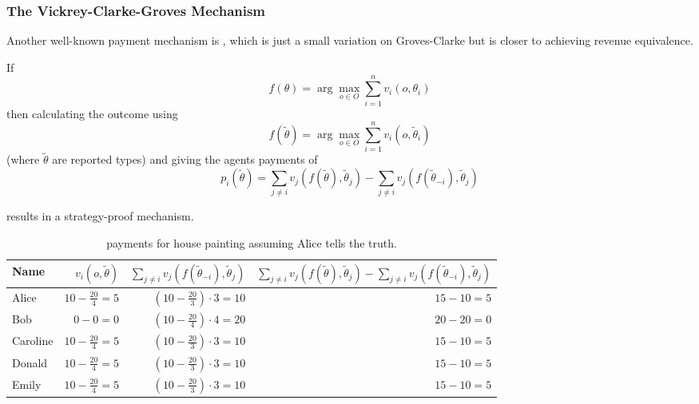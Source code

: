 \subsubsection{The Vickrey-Clarke-Groves Mechanism}

Another well-known payment mechanism is ,
which is just a small variation on Groves-Clarke but is closer to
achieving revenue equivalence.

\begin{theorem}
  \label{vcg}
  If
  \[
  f(\theta) = \arg \max_{o \in O} \sum_{i=1}^n v_i(o,\theta_i)
  \]
  then calculating the outcome using 
  \[
  f(\tilde{\theta}) = \arg \max_{o \in O} \sum_{i=1}^n v_i(o, \tilde{\theta}_i)
  \]
  (where $\tilde{\theta}$ are reported types) and giving the agents
  payments of 
  \begin{equation}
    \label{eq:vcg-payments}
  p_i(\tilde{\theta}) = \sum_{j \neq i} v_j(f(\tilde{\theta}),
  \tilde{\theta}_j)
  - \sum_{j \neq i} v_j(f(\tilde{\theta}_{-i}), \tilde{\theta}_j) 
  \end{equation}

  results in a strategy-proof mechanism.
\end{theorem}


\begin{SCtable}
  \begin{minipage}{1.0\linewidth}
    \begin{center}
      \renewcommand\arraystretch{1.5}
      \begin{tabular}{lrrr}\toprule
        Name & $v_i(o, \tilde{\theta})$
        &$\sum_{j \neq i} v_j(f(\tilde{\theta}_{-i}), \tilde{\theta}_j)$
        &$\sum_{j \neq i} v_j(f(\tilde{\theta}),
  \tilde{\theta}_j)
  - \sum_{j \neq i} v_j(f(\tilde{\theta}_{-i}), \tilde{\theta}_j)$
        \\ \midrule
        Alice  
        &$10 - \frac{20}{4} = 5$
        &$(10 - \frac{20}{3})\cdot 3 = 10$
        &$15 - 10 =  5$
        \\ 
        
        Bob  
        &$0 - 0 = 0$
        &$(10 - \frac{20}{4})\cdot 4 = 20$
        &$20 - 20 = 0 $
        \\ 
        
        Caroline  
        &$10 - \frac{20}{4} = 5$
        &$(10 - \frac{20}{3})\cdot 3 = 10$
        &$15 - 10 =  5$
        \\ 
        
        Donald  
        &$10 - \frac{20}{4} = 5$
        &$(10 - \frac{20}{3})\cdot 3 = 10$
        &$15 - 10 =  5$
        \\ 
        
        Emily  
        &$10 - \frac{20}{4} = 5$
        &$(10 - \frac{20}{3})\cdot 3 = 10$
        &$15 - 10 =  5$
        \\ \bottomrule
      \end{tabular}
    \end{center}
  \end{minipage}
  \caption{ payments for house painting assuming Alice tells the
    truth.}
  \label{tab:VCG}
\end{SCtable}

